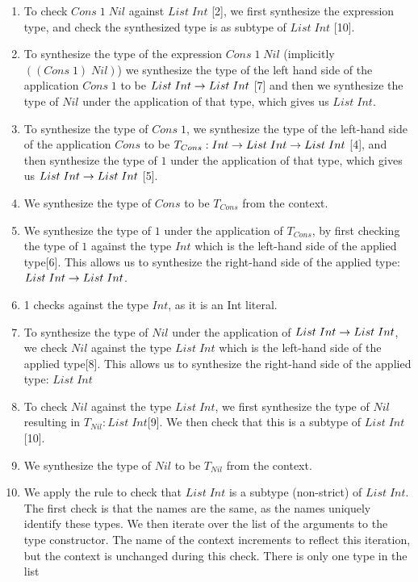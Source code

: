 \begin{enumerate}
    \item To check $Cons\;1\;Nil$ against $List\;Int$ [2], we first synthesize the expression type, and check the synthesized type is as subtype of $List\;Int$ [10].
    \item To synthesize the type of the expression $Cons\;1\;Nil$ (implicitly $((Cons\;1)\;Nil)$) we synthesize the type of the left hand side of the application $Cons\;1$ to be $List\;Int\rightarrow List\;Int$ [7] and then we synthesize the type of $Nil$ under the application of that type, which gives us $List\;Int$.
    \item To synthesize the type of $Cons\;1$, we synthesize the type of the left-hand side of the application $Cons$ to be $T_{Cons}: Int\rightarrow List\;Int\rightarrow List\;Int$ [4], and then synthesize the type of $1$ under the application of that type, which gives us $List\;Int\rightarrow List\;Int$ [5].
    \item We synthesize the type of $Cons$ to be $T_{Cons}$ from the context.
    \item We synthesize the type of $1$ under the application of $T_{Cons}$, by first checking the type of $1$ against the type $Int$ which is the left-hand side of the applied type[6]. This allows us to synthesize the right-hand side of the applied type: $List\;Int\rightarrow List\;Int$. 
    \item 1 checks against the type $Int$, as it is an Int literal.
    \item To synthesize the type of $Nil$ under the application of $List\;Int\rightarrow List\;Int$, we check $Nil$ against the type $List\;Int$ which is the left-hand side of the applied type[8]. This allows us to synthesize the right-hand side of the applied type: $List\;Int$
    \item To check $Nil$ against the type $List\;Int$, we first synthesize the type of $Nil$ resulting in $T_{Nil} :List\;Int$[9]. We then check that this is a subtype of $List\;Int$[10].
    \item We synthesize the type of $Nil$ to be $T_{Nil}$ from the context.
    \item We apply the \MyTCRule{\Unionsubrulename} rule to check that $List\;Int$ is a subtype (non-strict) of $List\;Int$. The first check is that the names are the same, as the names uniquely identify these types. We then iterate over the list of the arguments to the type constructor. The name of the context increments to reflect this iteration, but the context is unchanged during this check. There is only one type in the list
\end{enumerate}

